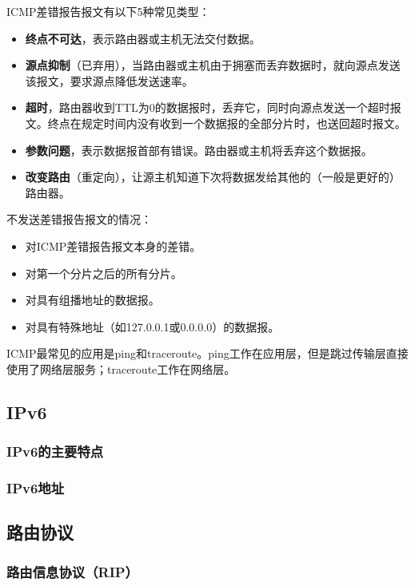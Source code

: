\documentclass[12pt, a4paper, oneside]{ctexart}
\begin{document}
\begin{enumerate}
    ICMP差错报告报文有以下5种常见类型：
    \begin{itemize}
        \item {\bf 终点不可达}，表示路由器或主机无法交付数据。
        \item {\bf 源点抑制}（已弃用），当路由器或主机由于拥塞而丢弃数据时，就向源点发送该报文，要求源点降低发送速率。
        \item {\bf 超时}，路由器收到TTL为0的数据报时，丢弃它，同时向源点发送一个超时报文。终点在规定时间内没有收到一个数据报的全部分片时，也送回超时报文。
        \item {\bf 参数问题}，表示数据报首部有错误。路由器或主机将丢弃这个数据报。
        \item {\bf 改变路由}（重定向），让源主机知道下次将数据发给其他的（一般是更好的）路由器。
    \end{itemize}

    不发送差错报告报文的情况：
    \begin{itemize}
        \item 对ICMP差错报告报文本身的差错。
        \item 对第一个分片之后的所有分片。
        \item 对具有组播地址的数据报。
        \item 对具有特殊地址（如127.0.0.1或0.0.0.0）的数据报。
    \end{itemize}

    ICMP最常见的应用是ping和traceroute。ping工作在应用层，但是跳过传输层直接使用了网络层服务；traceroute工作在网络层。
\end{enumerate}

\subsection{IPv6}

\subsubsection{IPv6的主要特点}

\subsubsection{IPv6地址}

\subsection{路由协议}

\subsubsection{路由信息协议（RIP）}
\end{document}
